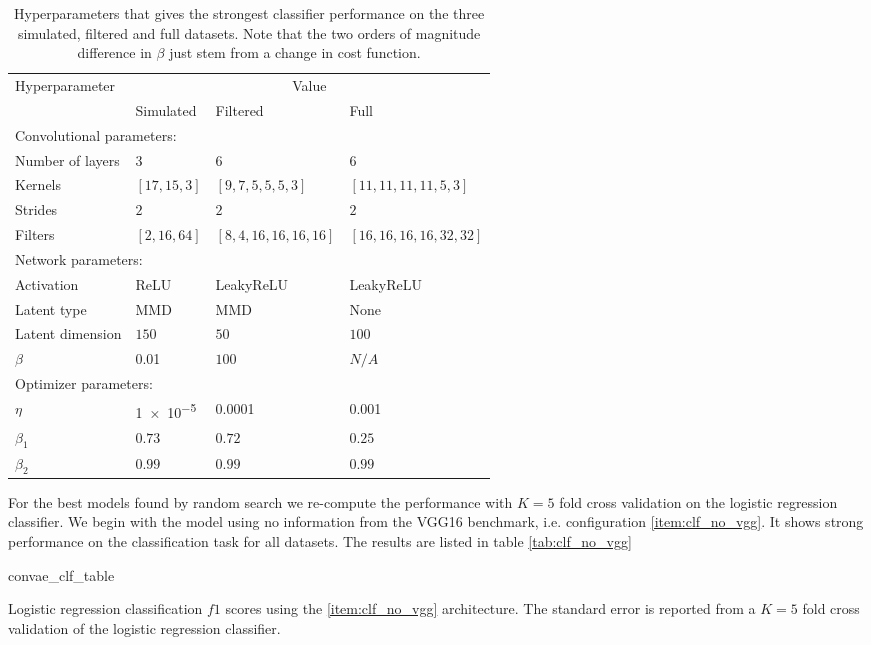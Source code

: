\begin{table}[ht]
\renewcommand*{\arraystretch}{0.7}
\centering
\caption{Hyperparameters that gives the strongest classifier performance on the three simulated, filtered and full datasets. Note that the two orders of magnitude difference in $\beta$ just stem from a change in cost function.}\label{tab:best_params_clf_convae}
\setlength{\extrarowheight}{15pt}
\hspace*{-0.5in}
\begin{tabular}{llll}
\toprule
Hyperparameter & \multicolumn{3}{c}{Value} \\
& Simulated & Filtered & Full \\
\midrule
\multicolumn{4}{l}{Convolutional parameters: } \\
\midrule
Number of layers & 3 & 6 & 6\\
Kernels & $[17, 15, 3]$ & $[9, 7, 5, 5, 5, 3]$ & $[11, 11, 11, 11, 5, 3]$ \\
Strides & $2$ & $2$ & $2$ \\
Filters & $[2, 16, 64]$ & $[8, 4, 16, 16, 16, 16]$ & $[16, 16, 16, 16, 32, 32]$ \\ 
\midrule
\multicolumn{4}{l}{Network parameters: } \\
\midrule
Activation & ReLU & LeakyReLU & LeakyReLU \\
Latent type & MMD & MMD & None \\
Latent dimension & $150$ & $50$ & $100$ \\
$\beta$ & \num{0.01} & $100$ & $ N/A $  \\
\midrule
\multicolumn{4}{l}{Optimizer parameters: } \\
\midrule
$\eta$ &  \num{1e-5} & \num{0.0001} & \num{0.001} \\
$\beta_1$ & $0.73$ & $0.72$ & $0.25$ \\
$\beta_2$ & $0.99$ & $0.99$ & $0.99$ \\
\bottomrule
\end{tabular}
\end{table}

For the best models found by random search we re-compute the performance with $K=5$ fold cross validation on the logistic regression classifier. We begin with the model using no information from the VGG16 benchmark, i.e. configuration \ref{item:clf_no_vgg}. It shows strong performance on the classification task for all datasets. The results are listed in table \ref{tab:clf_no_vgg}

\begin{table}
\centering
{convae_clf_table}
\caption{Logistic regression classification $f1$ scores using the \ref{item:clf_no_vgg} architecture. The standard error is reported from a $K=5$ fold cross validation of the logistic regression classifier.}\label{tab:clf_no_vgg}
\end{table}

